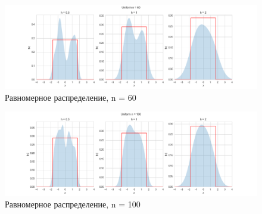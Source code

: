 \documentclass[../main.tex]{subfiles}
\begin{document}
    \begin{figure}[H]
        \centering
        \includegraphics[scale=0.5]{figures/UniformNuclear60.png}
        \caption{Равномерное распределение, n = 60}
        \label{fig:normal}
    \end{figure}
    
    \begin{figure}[H]
        \centering
        \includegraphics[scale=0.5]{figures/UniformNuclear100.png}
        \caption{Равномерное распределение, n = 100}
        \label{fig:normal}
    \end{figure}
\end{document}
